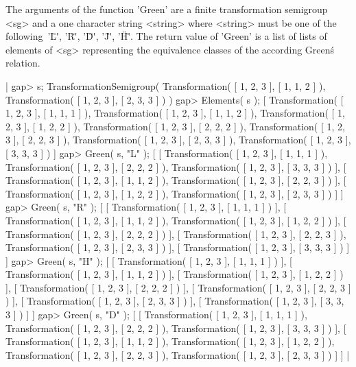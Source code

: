 The arguments of the function 'Green' are a finite transformation
semigroup <sg> and a one character string <string> where  
<string> must be one of the following\:\ '\"L\"', '\"R\"', 
'\"D\"', '\"J\"', '\"H\"'. The return value of 'Green' is
a list of lists of elements of <sg> representing the equivalence
classes of the according Green\'s relation. 

|  gap> s;
  TransformationSemigroup( Transformation( [ 1, 2, 3 ], 
  [ 1, 1, 2 ] ), Transformation( [ 1, 2, 3 ], [ 2, 3, 3 ] ) ) 
  gap> Elements( s );
  [ Transformation( [ 1, 2, 3 ], [ 1, 1, 1 ] ), 
    Transformation( [ 1, 2, 3 ], [ 1, 1, 2 ] ), 
    Transformation( [ 1, 2, 3 ], [ 1, 2, 2 ] ), 
    Transformation( [ 1, 2, 3 ], [ 2, 2, 2 ] ), 
    Transformation( [ 1, 2, 3 ], [ 2, 2, 3 ] ), 
    Transformation( [ 1, 2, 3 ], [ 2, 3, 3 ] ), 
    Transformation( [ 1, 2, 3 ], [ 3, 3, 3 ] ) ]
  gap> Green( s, "L" );
  [ [ Transformation( [ 1, 2, 3 ], [ 1, 1, 1 ] ), 
        Transformation( [ 1, 2, 3 ], [ 2, 2, 2 ] ), 
        Transformation( [ 1, 2, 3 ], [ 3, 3, 3 ] ) ], 
    [ Transformation( [ 1, 2, 3 ], [ 1, 1, 2 ] ), 
        Transformation( [ 1, 2, 3 ], [ 2, 2, 3 ] ) ], 
    [ Transformation( [ 1, 2, 3 ], [ 1, 2, 2 ] ), 
        Transformation( [ 1, 2, 3 ], [ 2, 3, 3 ] ) ] ]
  gap> Green( s, "R" );
  [ [ Transformation( [ 1, 2, 3 ], [ 1, 1, 1 ] ) ], 
    [ Transformation( [ 1, 2, 3 ], [ 1, 1, 2 ] ), 
        Transformation( [ 1, 2, 3 ], [ 1, 2, 2 ] ) ], 
    [ Transformation( [ 1, 2, 3 ], [ 2, 2, 2 ] ) ], 
    [ Transformation( [ 1, 2, 3 ], [ 2, 2, 3 ] ), 
        Transformation( [ 1, 2, 3 ], [ 2, 3, 3 ] ) ], 
    [ Transformation( [ 1, 2, 3 ], [ 3, 3, 3 ] ) ] ]
  gap> Green( s, "H" );
  [ [ Transformation( [ 1, 2, 3 ], [ 1, 1, 1 ] ) ], 
    [ Transformation( [ 1, 2, 3 ], [ 1, 1, 2 ] ) ], 
    [ Transformation( [ 1, 2, 3 ], [ 1, 2, 2 ] ) ], 
    [ Transformation( [ 1, 2, 3 ], [ 2, 2, 2 ] ) ], 
    [ Transformation( [ 1, 2, 3 ], [ 2, 2, 3 ] ) ], 
    [ Transformation( [ 1, 2, 3 ], [ 2, 3, 3 ] ) ], 
    [ Transformation( [ 1, 2, 3 ], [ 3, 3, 3 ] ) ] ]
  gap> Green( s, "D" );
  [ [ Transformation( [ 1, 2, 3 ], [ 1, 1, 1 ] ), 
        Transformation( [ 1, 2, 3 ], [ 2, 2, 2 ] ), 
        Transformation( [ 1, 2, 3 ], [ 3, 3, 3 ] ) ], 
    [ Transformation( [ 1, 2, 3 ], [ 1, 1, 2 ] ), 
        Transformation( [ 1, 2, 3 ], [ 1, 2, 2 ] ), 
        Transformation( [ 1, 2, 3 ], [ 2, 2, 3 ] ), 
        Transformation( [ 1, 2, 3 ], [ 2, 3, 3 ] ) ] ]
|



